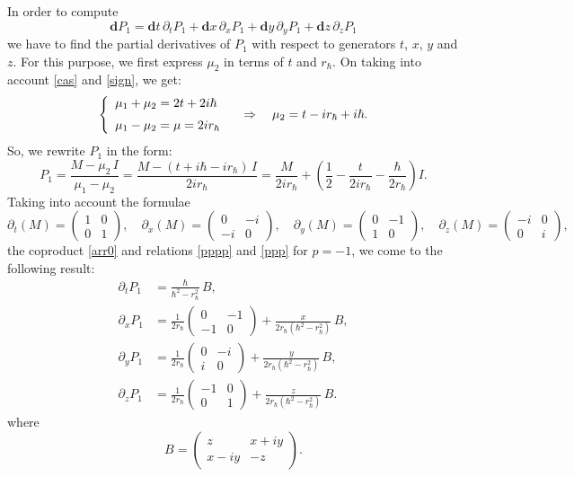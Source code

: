 \documentclass[11pt]{article}
\newcommand{\pa}{\partial}
\newcommand{\hh}{\hbar}
\newcommand{\rh}{r_{\hbar}}
\newcommand{\dd}{\mathbf{d}}
\numberwithin{equation}{section}
\theoremstyle{plain}
\theoremstyle{definition}
\begin{document}
In order to compute
\[
\dd P_1=\dd t \,\partial_tP_1 +\dd x \,\partial_xP_1 +\dd y \,\partial_yP_1 + \dd z \,\partial_zP_1
\]
we have to find the partial derivatives of $P_1$ with respect to generators $t$, $x$, $y$ and $z$. For this purpose,
we first express $\mu_2$ in terms of $t$ and $\rh$. On taking into account \eqref{cas} and \eqref{sign}, we get:
\[
\left\{
\begin{array}{l}
\mu_1+\mu_2=2t+2i\hh\\
\rule{0pt}{5mm}
\mu_1-\mu_2=\mu=2i \rh
\end{array}
\right.\quad \Rightarrow\quad
\mu_2=t - i\rh +i\hh.
\]
So, we rewrite $P_1$ in the form:
\[
P_1=\frac{M-\mu_2\,I}{\mu_1-\mu_2}=\frac{M-(t+i\hh-i\rh)\,I}{2i\rh} = \frac{M}{2i\rh}+\left(\frac{1}{2}-\frac{t}{2i\rh}-\frac{\hh}{2\rh}\right) I.
\]
Taking into account the formulae
\[
\pa_t(M)=\left(\!\!\begin{array}{cc}
	1& 0\\
	0& 1
\end{array}\!\!\right),\quad \pa_x(M)=\left(\!\!\begin{array}{cc}
	0& -i\\
	-i& 0
\end{array}\!\!\right),\quad \pa_y(M)=\left(\!\!\begin{array}{cc}
	0& -1\\
	1& 0
\end{array}\!\!\right),\quad \pa_z(M)=\left(\!\!\begin{array}{cc}
	-i& 0\\
	0& i
\end{array}\!\!\right),
\]
the coproduct \eqref{arr0} and relations \eqref{pppp} and \eqref{ppp} for $p=-1$, we come to the following result:
\begin{align*}
\pa_tP_1&=\frac{\hh}{\hh^2-\rh^2}\,B,\\
\pa_xP_1&=\frac{1}{2\rh}
\begin{pmatrix}0&-1\\-1&0\end{pmatrix}
+\frac{x}{2\rh(\hh^2-\rh^2)}\,B,\\
\pa_yP_1&=\frac{1}{2\rh}
\begin{pmatrix}0&-i\\ i&0\end{pmatrix}
+\frac{y}{2\rh(\hh^2-\rh^2)}\,B,\\
\pa_zP_1&=\frac{1}{2\rh}
\begin{pmatrix}-1&0\\0&1\end{pmatrix}
+\frac{z}{2\rh(\hh^2-\rh^2)}\,B.
\end{align*}
where
\[
B=\left(\!\!\begin{array}{cc}
		z&x+i y\\
		x-i y&-z
	\end{array}\!\!\right).
\]
\end{document}
